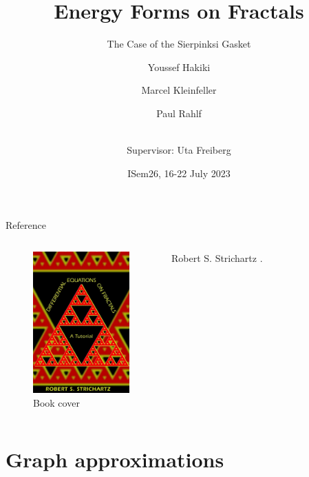 \documentclass[notheorems]{beamer}
\title{Energy Forms on Fractals}
\subtitle{The Case of the Sierpinksi Gasket}
\author %
{Youssef Hakiki\inst{1} \and Marcel Kleinfeller\inst{2} \and Paul Rahlf\inst{3} \and \\[3mm] {\small Supervisor: Uta Freiberg\inst{4}}}
\institute[VFU] %
{
  \inst{1}%
  Cadi Ayyad University
  \and
  \inst{2}%
  Technical University of Darmstadt
  \and
  \inst{3}%
  Kiel University
  \and
  \inst{4}%
  Chemnitz University of Technology
}
\date %
{ISem26, 16-22 July 2023}
\theoremstyle{definition}
\theoremstyle{plain}
\theoremstyle{remark}
\newcommand{\1}{\mathds{1}} %
\begin{document}
\begin{frame}
    \titlepage
\end{frame}


\begin{frame}{Reference}
  \begin{columns}[c]
    \begin{figure}
        \centering
        \includegraphics[width=10em]{images/book.pdf}
        \caption{Book cover}
    \end{figure}
    \begin{thebibliography}{10}
      \alert{Robert S. Strichartz}
      .
    \end{thebibliography}
\end{columns}
\end{frame}

\section{Graph approximations}



\end{document}
